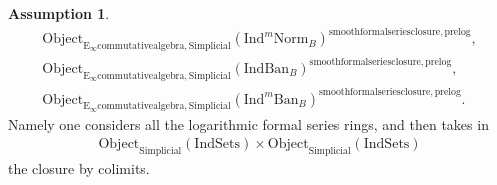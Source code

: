 \documentclass[11pt]{book}
\theoremstyle{definition}
\numberwithin{equation}{section}
\newtheorem{assumption}[theorem]{Assumption}
\begin{document}
\begin{assumption}
\begin{align}
\mathrm{Object}_{\mathrm{E}_\infty\mathrm{commutativealgebra},\mathrm{Simplicial}}(\mathrm{Ind}^m\mathrm{Norm}_{B})^{\mathrm{smoothformalseriesclosure},\text{prelog}},\\
\mathrm{Object}_{\mathrm{E}_\infty\mathrm{commutativealgebra},\mathrm{Simplicial}}(\mathrm{IndBan}_{B})^{\mathrm{smoothformalseriesclosure},\text{prelog}},\\
\mathrm{Object}_{\mathrm{E}_\infty\mathrm{commutativealgebra},\mathrm{Simplicial}}(\mathrm{Ind}^m\mathrm{Ban}_{B})^{\mathrm{smoothformalseriesclosure},\text{prelog}}.
\end{align}	
Namely one considers all the logarithmic formal series rings, and then takes in 
\begin{align}
\mathrm{Object}_{\mathrm{Simplicial}}(\mathrm{IndSets})\times \mathrm{Object}_{\mathrm{Simplicial}}(\mathrm{IndSets})
\end{align}
the closure by colimits.\\
\end{assumption}


\
\end{document}
